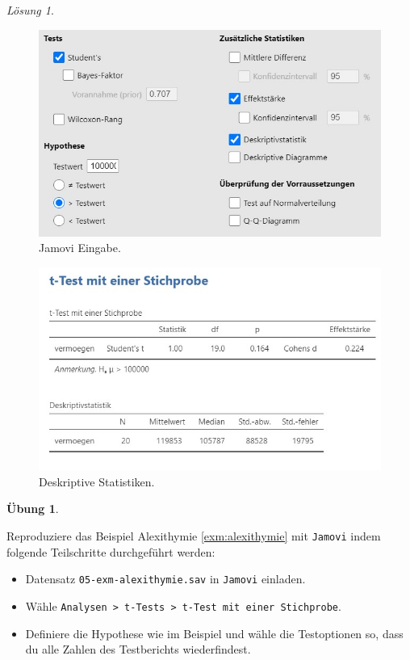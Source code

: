 \documentclass[
]{book}
\providecommand{\tightlist}{%
  \setlength{\itemsep}{0pt}\setlength{\parskip}{0pt}}
\theoremstyle{definition}
\theoremstyle{definition}
\theoremstyle{definition}
\newtheorem{exercise}{Übung}[chapter]
\theoremstyle{definition}
\theoremstyle{remark}
\newtheorem*{solution}{Lösung}
\begin{document}
\begin{solution}
\leavevmode

\begin{figure}
\includegraphics[width=1\linewidth]{figures/05-exr-vermoegen-jmv-input} \caption{Jamovi Eingabe.}\label{fig:sol-vermoegen-input}
\end{figure}

\begin{figure}
\includegraphics[width=1\linewidth]{figures/05-exr-vermoegen-jmv-output} \caption{Deskriptive Statistiken.}\label{fig:sol-vermoegen-output}
\end{figure}

\end{solution}

\begin{exercise}
\protect\hypertarget{exr:alexithymie}{}\label{exr:alexithymie}\leavevmode

Reproduziere das Beispiel Alexithymie \ref{exm:alexithymie} mit \texttt{Jamovi} indem folgende Teilschritte durchgeführt werden:

\begin{itemize}
\tightlist
\item
  Datensatz \texttt{05-exm-alexithymie.sav} in \texttt{Jamovi} einladen.
\item
  Wähle \texttt{Analysen\ \textgreater{}\ t-Tests\ \textgreater{}\ t-Test\ mit\ einer\ Stichprobe}.
\item
  Definiere die Hypothese wie im Beispiel und wähle die Testoptionen so, dass du alle Zahlen des Testberichts wiederfindest.
\end{itemize}

\end{exercise}
\end{document}
